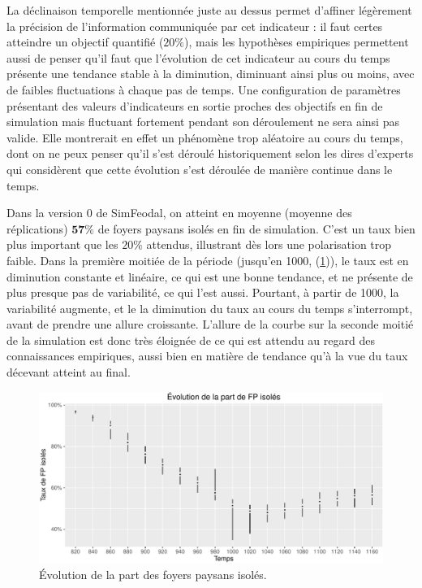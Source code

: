 La \og déclinaison temporelle\fg{} mentionnée juste au dessus permet d'affiner légèrement la précision de l'information communiquée par cet indicateur : il faut certes atteindre un objectif quantifié ($20\%$), mais les hypothèses empiriques permettent aussi de penser qu'il faut que l'évolution de cet indicateur au cours du temps présente une tendance stable à la diminution, diminuant ainsi plus ou moins, avec de faibles fluctuations à chaque pas de temps.
Une configuration de paramètres présentant des valeurs d'indicateurs en sortie proches des objectifs en fin de simulation mais fluctuant fortement pendant son déroulement ne sera ainsi pas valide. Elle montrerait en effet  un phénomène trop aléatoire au cours du temps, dont on ne peux penser qu'il s'est déroulé historiquement selon les dires d'experts qui considèrent que cette évolution s'est déroulée de manière continue dans le temps.

\begin{mdframed}[backgroundcolor=gray!10,footnoteinside=false]
	
	Dans la version 0 de SimFeodal, on atteint en moyenne (moyenne des réplications) $\textbf{57\%}$ de foyers paysans isolés en fin de simulation.
	C'est un taux bien plus important que les $20\%$ attendus, illustrant dès lors une polarisation trop faible.
	Dans la première moitiée de la période (jusqu'en 1000, (\cref{fig:taux-isoles-v0})), le taux est en diminution constante et linéaire, ce qui est une bonne tendance, et ne présente de plus presque pas de variabilité, ce qui l'est aussi.
	Pourtant, à partir de 1000, la variabilité augmente, et le la diminution du taux au cours du temps s'interrompt, avant de prendre une allure croissante.
	L'allure de la courbe sur la seconde moitié de la simulation est donc très éloignée de ce qui est attendu au regard des connaissances empiriques, aussi bien en matière de tendance qu'à la vue du taux décevant atteint au final.
\end{mdframed}

\begin{figure}[H]
	\captionsetup{width=\linewidth}
	\includegraphics[width=\linewidth]{img/resultats/v0_taux_FP_isoles.pdf}
	\caption{Évolution de la part des foyers paysans isolés.} 
	\label{fig:taux-isoles-v0} 
\end{figure}

